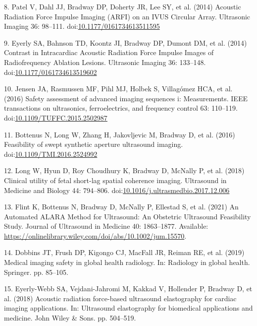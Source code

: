 \documentclass[
]{article}
\newenvironment{cslreferences}%
  {}%
  {\par}
\begin{document}
\begin{cslreferences}
\leavevmode\hypertarget{ref-Patel2014}{}%
8. Patel V, Dahl JJ, Bradway DP, Doherty JR, Lee SY, et al. (2014)
Acoustic Radiation Force Impulse Imaging (ARFI) on an IVUS Circular
Array. Ultrasonic Imaging 36: 98--111.
doi:\href{https://doi.org/10.1177/0161734613511595}{10.1177/0161734613511595}

\leavevmode\hypertarget{ref-Eyerly2014}{}%
9. Eyerly SA, Bahnson TD, Koontz JI, Bradway DP, Dumont DM, et al.
(2014) Contrast in Intracardiac Acoustic Radiation Force Impulse Images
of Radiofrequency Ablation Lesions. Ultrasonic Imaging 36: 133--148.
doi:\href{https://doi.org/10.1177/0161734613519602}{10.1177/0161734613519602}

\leavevmode\hypertarget{ref-jensen2016}{}%
10. Jensen JA, Rasmussen MF, Pihl MJ, Holbek S, Villagómez HCA, et al.
(2016) Safety assessment of advanced imaging sequences i: Measurements.
IEEE transactions on ultrasonics, ferroelectrics, and frequency control
63: 110--119.
doi:\href{https://doi.org/10.1109/TUFFC.2015.2502987}{10.1109/TUFFC.2015.2502987}

\leavevmode\hypertarget{ref-bottenus2016}{}%
11. Bottenus N, Long W, Zhang H, Jakovljevic M, Bradway D, et al. (2016)
Feasibility of swept synthetic aperture ultrasound imaging.
doi:\href{https://doi.org/10.1109/TMI.2016.2524992}{10.1109/TMI.2016.2524992}

\leavevmode\hypertarget{ref-Long2017umb}{}%
12. Long W, Hyun D, Roy Choudhury K, Bradway D, McNally P, et al. (2018)
Clinical utility of fetal short-lag spatial coherence imaging.
Ultrasound in Medicine and Biology 44: 794--806.
doi:\href{https://doi.org/10.1016/j.ultrasmedbio.2017.12.006}{10.1016/j.ultrasmedbio.2017.12.006}

\leavevmode\hypertarget{ref-Flint2020}{}%
13. Flint K, Bottenus N, Bradway D, McNally P, Ellestad S, et al. (2021)
An Automated ALARA Method for Ultrasound: An Obstetric Ultrasound
Feasibility Study. Journal of Ultrasound in Medicine 40: 1863--1877.
Available:
\url{https://onlinelibrary.wiley.com/doi/abs/10.1002/jum.15570}.

\leavevmode\hypertarget{ref-dobbins2019medical}{}%
14. Dobbins JT, Frush DP, Kigongo CJ, MacFall JR, Reiman RE, et al.
(2019) Medical imaging safety in global health radiology. In: Radiology
in global health. Springer. pp. 85--105.

\leavevmode\hypertarget{ref-eyerly2018acoustic}{}%
15. Eyerly-Webb SA, Vejdani-Jahromi M, Kakkad V, Hollender P, Bradway D,
et al. (2018) Acoustic radiation force-based ultrasound elastography for
cardiac imaging applications. In: Ultrasound elastography for biomedical
applications and medicine. John Wiley \& Sons. pp. 504--519.


\end{cslreferences}
\end{document}
